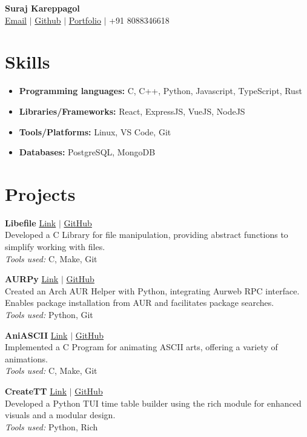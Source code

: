 \documentclass[a4paper,10pt]{article}
\newcommand{\projectentry}[5]{
  \noindent
  \textbf{#1} \hfill
  \href{#4}{Link} $|$ \href{#5}{GitHub} \\
  #2 \\
  \textit{Tools used:} #3
  \vspace{6pt} %
}
\begin{document}
\pagestyle{empty}

\begin{center}
  \textbf{\LARGE Suraj Kareppagol} \\
  \vspace{6pt}
  \href{surajkareppagol.social@gmail.com}{Email} $|$ \href{https://github.com/surajkareppagol}{Github} $|$ \href{https://surajkareppagol.github.io}{Portfolio} $|$ +91 8088346618
\end{center}

\section*{Skills}
\begin{itemize}[label=--,left=0pt, align=left]
  \item \textbf{Programming languages:} C, C++, Python, Javascript, TypeScript, Rust
  \item \textbf{Libraries/Frameworks:} React, ExpressJS, VueJS, NodeJS
  \item \textbf{Tools/Platforms:} Linux, VS Code, Git
  \item \textbf{Databases:} PostgreSQL, MongoDB
\end{itemize}

\section*{Projects}
\projectentry{Libefile}{
  Developed a C Library for file manipulation, providing abstract functions to simplify working with files.
}{
  C, Make, Git
}{https://github.com/surajkareppagol/Lib-efile}{https://github.com/surajkareppagol/Lib-efile}

\projectentry{AURPy}{
  Created an Arch AUR Helper with Python, integrating Aurweb RPC interface. Enables package installation from AUR and facilitates package searches.
}{
  Python, Git
}{https://github.com/surajkareppagol/AURPy}{https://github.com/surajkareppagol/AURPy}

\projectentry{AniASCII}{
  Implemented a C Program for animating ASCII arts, offering a variety of animations.
}{
  C, Make, Git
}{https://github.com/surajkareppagol/ANIASCII}{https://github.com/surajkareppagol/ANIASCII}

\projectentry{CreateTT}{
  Developed a Python TUI time table builder using the rich module for enhanced visuals and a modular design.
}{
  Python, Rich
}{https://github.com/surajkareppagol/CreateTT}{https://github.com/surajkareppagol/CreateTT}
\end{document}
